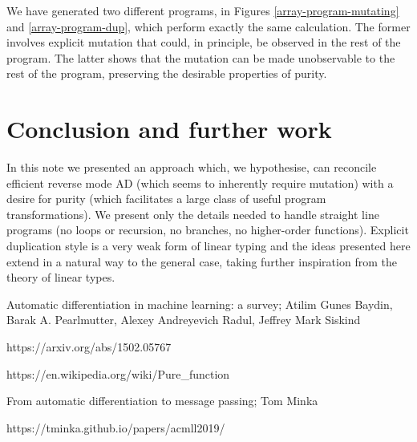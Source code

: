 \documentclass[12pt]{article}
\begin{document}
We have generated two different programs, in Figures
\ref{array-program-mutating} and \ref{array-program-dup}, which
perform exactly the same calculation.  The former involves explicit
mutation that could, in principle, be observed in the rest of the
program.  The latter shows that the mutation can be made unobservable
to the rest of the program, preserving the desirable properties of
purity.

\section{Conclusion and further work}

In this note we presented an approach which, we hypothesise, can
reconcile efficient reverse mode AD (which seems to inherently require mutation)
with a desire for purity (which facilitates a large class of useful
program transformations).  We present only the details needed to
handle straight line programs (no loops or recursion, no branches, no
higher-order functions).  Explicit duplication style is a very weak
form of linear typing and the ideas presented here extend in a natural
way to the general case, taking further inspiration from the theory of
linear types.






\begin{thebibliography}{9}

  Automatic differentiation in machine learning: a survey;
  Atilim Gunes Baydin, Barak A. Pearlmutter, Alexey Andreyevich Radul, Jeffrey Mark Siskind
  
https://arxiv.org/abs/1502.05767
  
  https://en.wikipedia.org/wiki/Pure\_function


  From automatic differentiation to message passing; Tom Minka

  https://tminka.github.io/papers/acmll2019/

\end{thebibliography}
\end{document}
